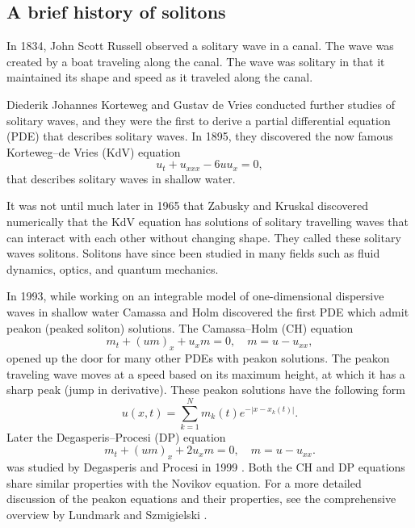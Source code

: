 \documentclass[english,master]{liumaiex}
\theoremstyle{plain}
\theoremstyle{definition}
\begin{document}
\subsection{A brief history of solitons}

In 1834, John Scott Russell observed a solitary wave in a canal. The wave was created by a boat traveling along the canal. The wave was solitary in that it maintained its shape and speed as it traveled along the canal.

Diederik Johannes Korteweg and Gustav de Vries conducted further studies of solitary waves, and they were the first to derive a partial differential equation (PDE) that describes solitary waves. In 1895, they discovered the now famous Korteweg--de Vries (KdV) equation
\begin{equation}
	u_t + u_{xxx} - 6uu_x = 0,
\end{equation}
that describes solitary waves in shallow water.

It was not until much later in 1965 that Zabusky and Kruskal \cite{Zabusky1965} discovered numerically that the KdV equation has solutions of solitary travelling waves that can interact with each other without changing shape. They called these solitary waves solitons. Solitons have since been studied in many fields such as fluid dynamics, optics, and quantum mechanics.

In 1993\cite{Camassa_1993}, while working on an integrable model of one-dimensional dispersive waves in shallow water Camassa and Holm discovered the first PDE which admit peakon (peaked soliton) solutions. The Camassa--Holm (CH) equation
\begin{equation} \label{eq:CH}
	m_t + (um)_x + u_xm = 0,\quad m = u - u_{xx},
\end{equation}
opened up the door for many other PDEs with peakon solutions. The peakon traveling wave moves at a speed based on its maximum height, at which
it has a sharp peak (jump in derivative). These peakon solutions have the following form
\begin{equation} \label{eq:peakon}
	u(x, t) = \sum_{k = 1}^{N} m_k(t) e^{-|x - x_k(t)|}.
\end{equation}
Later the Degasperis--Procesi (DP) equation
\begin{equation} \label{eq:DP}
	m_t + (um)_x + 2u_xm = 0,\quad m = u - u_{xx}.
\end{equation}
was studied by Degasperis and Procesi in 1999 \cite{Degasperis_1999}. Both the CH and DP equations share similar properties with the Novikov equation. For a more detailed discussion of the peakon equations and their properties, see the comprehensive overview by Lundmark and Szmigielski \cite{Lundmark_2022}.
\end{document}
